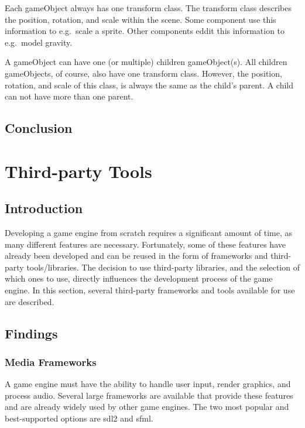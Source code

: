 \documentclass{projdoc}
\begin{document}
Each gameObject always has one transform class. The transform class describes the
position, rotation, and scale within the scene. Some component use this information
to e.g.~scale a sprite. Other components eddit this information to e.g.~model
gravity. \autocite{man:unityTransformClass}

A gameObject can have one (or multiple) children gameObject(s). All children
gameObjects, of course, also have one transform class. However, the position,
rotation, and scale of this class, is always the same as the child's parent. A child
can not have more than one parent. \autocite{man:unityTransformClass}

\subsection{Conclusion}

\section{Third-party Tools}

\subsection{Introduction}

Developing a game engine from scratch requires a significant amount of time, as many
different features are necessary. Fortunately, some of these features have already
been developed and can be reused in the form of frameworks and third-party
tools/libraries. The decision to use third-party libraries, and the selection of
which ones to use, directly influences the development process of the game engine. In
this section, several third-party frameworks and tools available for use are
described.

\subsection{Findings}

\subsubsection{Media Frameworks}

A game engine must have the ability to handle user input, render graphics, and
process audio. Several large frameworks are available that provide these features and
are already widely used by other game engines. The two most popular and
best-supported options are \gls{sdl2} and \gls{sfml}.
\end{document}
